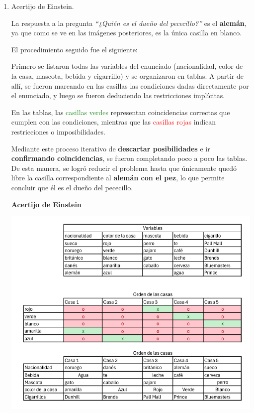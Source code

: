 \documentclass[12pt,letterpaper]{exam}
\begin{document}
\begin{enumerate}
  \item Acertijo de Einstein.
  
  	La respuesta a la pregunta \textit{``¿Quién es el dueño del pececillo?''} es el 
  	\textbf{alemán}, ya que como se ve en las imágenes posteriores, es la única casilla en 
  	blanco.  
	
  	El procedimiento seguido fue el siguiente:  
	
  	Primero se listaron todas las variables del enunciado (nacionalidad, color de la casa, 
  	mascota, bebida y cigarrillo) y se organizaron en tablas. A partir de allí, se fueron 
  	marcando en las casillas las condiciones dadas directamente por el enunciado, y luego 
  	se fueron deduciendo las restricciones implícitas.  
	
  	En las tablas, las \textcolor{ForestGreen}{casillas verdes} representan coincidencias 
  	correctas que cumplen con las condiciones, mientras que las \textcolor{red}{casillas rojas} 
  	indican restricciones o imposibilidades.  
	
  	Mediante este proceso iterativo de \textbf{descartar posibilidades} e ir 
  	\textbf{confirmando coincidencias}, se fueron completando poco a poco las tablas. 
  	De esta manera, se logró reducir el problema hasta que únicamente quedó libre la 
  	casilla correspondiente al \textbf{alemán con el pez}, lo que permite concluir que él 
  	es el dueño del pececillo.  



\begin{center}
  
\Large\textbf{Acertijo de Einstein}\par
  \vspace{8mm}

  \includegraphics[width=\textwidth,keepaspectratio]{../assets/Talleres_fundamentos/Asertijo_Eintein_1.png}


\end{center}
\end{enumerate}
\end{document}
